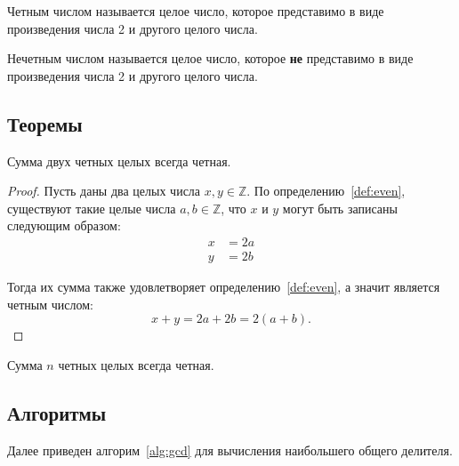 \begin{definition}\label{def:even} Четным числом называется целое число, которое представимо
в виде произведения числа 2 и другого целого числа.
\end{definition}

\begin{definition}\label{def:odd} Нечетным числом называется целое
число, которое \textbf{не} представимо в виде произведения числа 2 и
другого целого числа.
\end{definition}

\subsection{Теоремы}\label{sec:theorems}

\begin{theorem}\label{thm:even} Сумма двух четных целых всегда четная.
\end{theorem}

\begin{proof} Пусть даны два целых числа $x, y \in \mathbb{Z}$. По определению\ \ref{def:even},
существуют такие целые числа $a, b \in \mathbb{Z}$, что $x$ и $y$ могут быть записаны следующим образом:
$$
\begin{aligned}
x &= 2a \\
y &= 2b
\end{aligned}
$$

Тогда их сумма также удовлетворяет определению\ \ref{def:even},
а значит является четным числом:
$$
x + y = 2a + 2b = 2(a + b).
$$
\end{proof}

\begin{corollary}\label{cor:even} Сумма $n$ четных целых всегда четная.
\end{corollary}

\subsection{Алгоритмы}\label{sec:algorithms}

Далее приведен алгорим~\ref{alg:gcd} для вычисления наибольшего общего
делителя.

